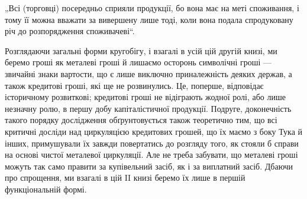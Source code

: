 „Всі (торговці) посередньо сприяли продукції, бо вона має на меті
споживання, і тому її можна вважати за вивершену лише тоді, коли
вона подала спродуковану річ до розпорядження споживачеві“.

Розглядаючи загальні форми кругобігу, і взагалі в усій цій другій
книзі, ми беремо гроші як металеві гроші й лишаємо осторонь
символічні гроші — звичайні знаки вартости, що є лише виключно приналежність
деяких держав, а також кредитові гроші, які ще не розвинулись.
Це, поперше, відповідає історичному розвиткові; кредитові гроші
не відіграють жодної ролі, або лише незначну ролю, в першу добу капіталістичної
продукції. Подруге, доконечність такого порядку дослідження
обґрунтовується також теоретично тим, що всі критичні досліди над
циркуляцією кредитових грошей, що їх маємо з боку Тука й інших,
примушували їх завжди повертатись до розгляду того, як стояли б справи
на основі чистої металевої циркуляції. Але не треба забувати, що металеві
гроші можуть так само правити за купівельний засіб, як і за виплатний
засіб. Дбаючи про спрощення, ми взагалі в цій II книзі беремо їх лише
в першій функціональній формі.

